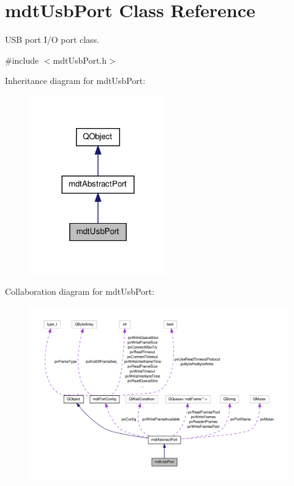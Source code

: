 \hypertarget{classmdt_usb_port}{\section{mdt\-Usb\-Port Class Reference}
\label{classmdt_usb_port}
}


U\-S\-B port I/\-O port class.  




{\ttfamily \#include $<$mdt\-Usb\-Port.\-h$>$}



Inheritance diagram for mdt\-Usb\-Port\-:\nopagebreak
\begin{figure}[H]
\begin{center}
\leavevmode
\includegraphics[width=168pt]{classmdt_usb_port__inherit__graph}
\end{center}
\end{figure}


Collaboration diagram for mdt\-Usb\-Port\-:\nopagebreak
\begin{figure}[H]
\begin{center}
\leavevmode
\includegraphics[width=350pt]{classmdt_usb_port__coll__graph}
\end{center}
\end{figure}
